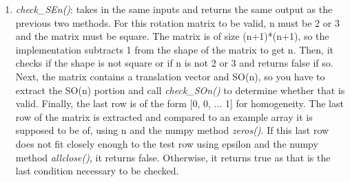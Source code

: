 \documentclass{article}
\begin{document}
\begin{enumerate}
\item \textit{check\_SEn()}: takes in the same inputs and returns the same output as the previous two methods. For this rotation matrix to be valid, n must be 2 or 3 and the matrix must be square. The matrix is of size (n+1)*(n+1), so the implementation subtracts 1 from the shape of the matrix to get n. Then, it checks if the shape is not square or if n is not 2 or 3 and returns false if so. Next, the matrix contains a translation vector and SO(n), so you have to extract the SO(n) portion and call \textit{check\_SOn()} to determine whether that is valid. Finally, the last row is of the form [0, 0, ... 1] for homogeneity. The last row of the matrix is extracted and compared to an example array it is supposed to be of, using n and the numpy method \textit{zeros()}. If this last row does not fit closely enough to the test row using epsilon and the numpy method \textit{allclose()}, it returns false. Otherwise, it returns true as that is the last condition necessary to be checked.
\end{enumerate}
\end{document}
